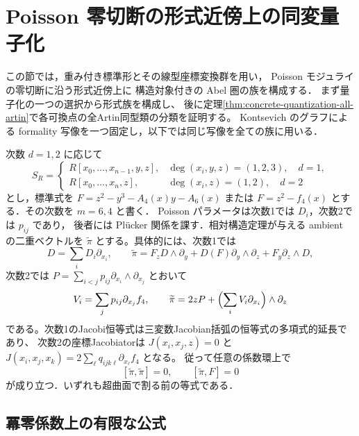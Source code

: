 \section{Poisson 零切断の形式近傍上の同変量子化}
\label{sec:equivariant-quantization}

この節では，重み付き標準形とその線型座標変換群を用い，
Poisson モジュライの零切断に沿う形式近傍上に
構造対象付きの Abel 圏の族を構成する．
まず量子化の一つの選択から形式族を構成し、
後に定理\ref{thm:concrete-quantization-all-artin}で各可換点の全Artin同型類の分類を証明する。
Kontsevich のグラフによる formality 写像を一つ固定し，以下では同じ写像を全ての族に用いる．

次数 $d=1,2$ に応じて
\[
 S_R=\begin{cases}
 R[x_0,\ldots,x_{n-1},y,z],&\deg(x_i,y,z)=(1,2,3),\quad d=1,\\
 R[x_0,\ldots,x_n,z],&\deg(x_i,z)=(1,2),\quad d=2
 \end{cases}
\]
とし，標準式を $F=z^2-y^3-A_4(x)y-A_6(x)$ または
$F=z^2-f_4(x)$ とする．その次数を $m=6,4$ と書く．
Poisson パラメータは次数1では $D_i$，次数2では $p_{ij}$ であり，
後者には Pl\"ucker 関係を課す．相対構造定理が与える ambient の二重ベクトルを
$\widetilde\pi$ とする。具体的には、次数1では
\[
 D=\sum_iD_i\partial_{x_i},\qquad
 \widetilde\pi=F_zD\wedge\partial_y+D(F)\partial_y\wedge\partial_z
              +F_y\partial_z\wedge D,
\]
次数2では $P=\sum_{i<j}p_{ij}\partial_{x_i}\wedge\partial_{x_j}$ とおいて
\[
 V_i=\sum_jp_{ij}\partial_{x_j}f_4,\qquad
 \widetilde\pi=2zP+\Bigl(\sum_iV_i\partial_{x_i}\Bigr)\wedge\partial_z
\]
である。次数1のJacobi恒等式は三変数Jacobian括弧の恒等式の多項式的延長であり、
次数2の座標Jacobiatorは $J(x_i,x_j,z)=0$ と
$J(x_i,x_j,x_k)=2\sum_\ell q_{ijk\ell}\partial_{x_\ell}f_4$ となる。
従って任意の係数環上で
\[
 [\widetilde\pi,\widetilde\pi]=0,\qquad
 [\widetilde\pi,F]=0
\]
が成り立つ．いずれも超曲面で割る前の等式である．

\subsection{冪零係数上の有限な公式}

